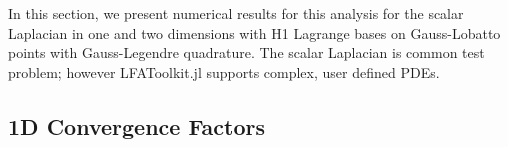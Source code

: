 \documentclass[review]{siamart190516}
\begin{document}
In this section, we present numerical results for this analysis for the scalar Laplacian in one and two dimensions with H1 Lagrange bases on Gauss-Lobatto points with Gauss-Legendre quadrature.
The scalar Laplacian is common test problem; however LFAToolkit.jl supports complex, user defined PDEs.

\subsection{1D Convergence Factors}\label{sec:1dresults}

\begin{figure}[!tbp]
  \centering
     \\

\end{figure}
\end{document}
